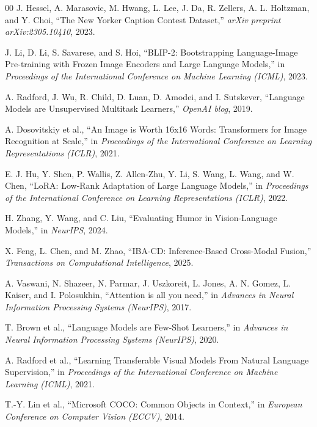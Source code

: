 \documentclass[10pt, conference, compsoc]{IEEEtran}
\begin{document}
\begin{thebibliography}{00}
J. Hessel, A. Marasovic, M. Hwang, L. Lee, J. Da, R. Zellers, A. L. Holtzman, and Y. Choi, ``The New Yorker Caption Contest Dataset,'' \textit{arXiv preprint arXiv:2305.10410}, 2023.

J. Li, D. Li, S. Savarese, and S. Hoi, ``BLIP-2: Bootstrapping Language-Image Pre-training with Frozen Image Encoders and Large Language Models,'' in \textit{Proceedings of the International Conference on Machine Learning (ICML)}, 2023.

A. Radford, J. Wu, R. Child, D. Luan, D. Amodei, and I. Sutskever, ``Language Models are Unsupervised Multitask Learners,'' \textit{OpenAI blog}, 2019.

A. Dosovitskiy et al., ``An Image is Worth 16x16 Words: Transformers for Image Recognition at Scale,'' in \textit{Proceedings of the International Conference on Learning Representations (ICLR)}, 2021.

E. J. Hu, Y. Shen, P. Wallis, Z. Allen-Zhu, Y. Li, S. Wang, L. Wang, and W. Chen, ``LoRA: Low-Rank Adaptation of Large Language Models,'' in \textit{Proceedings of the International Conference on Learning Representations (ICLR)}, 2022.

H. Zhang, Y. Wang, and C. Liu, ``Evaluating Humor in Vision-Language Models,'' in \textit{NeurIPS}, 2024.

X. Feng, L. Chen, and M. Zhao, ``IBA-CD: Inference-Based Cross-Modal Fusion,'' \textit{Transactions on Computational Intelligence}, 2025.

A. Vaswani, N. Shazeer, N. Parmar, J. Uszkoreit, L. Jones, A. N. Gomez, L. Kaiser, and I. Polosukhin, ``Attention is all you need,'' in \textit{Advances in Neural Information Processing Systems (NeurIPS)}, 2017.

T. Brown et al., ``Language Models are Few-Shot Learners,'' in \textit{Advances in Neural Information Processing Systems (NeurIPS)}, 2020.

A. Radford et al., ``Learning Transferable Visual Models From Natural Language Supervision,'' in \textit{Proceedings of the International Conference on Machine Learning (ICML)}, 2021.

T.-Y. Lin et al., ``Microsoft COCO: Common Objects in Context,'' in \textit{European Conference on Computer Vision (ECCV)}, 2014.


\end{thebibliography}
\end{document}
